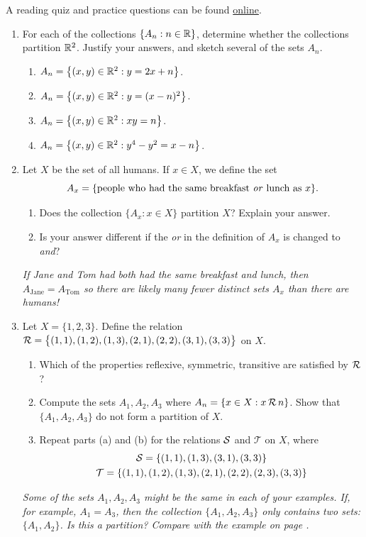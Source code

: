\begin{exercises}{}{}
	A reading quiz and practice questions can be found \href{http://www.math.uci.edu/~ndonalds/math13/selftest/7-4-partitions.html}{online}.

\begin{enumerate}
	\item For each of the collections $\{A_n:n\in\mathbb{R}\}$, determine whether the collections partition $\mathbb{R}^2$. Justify your answers, and sketch several of the sets $A_n$.
	\begin{enumerate}
		\item $A_n=\big\{(x,y)\in\mathbb{R}^2:y=2x+n\big\}$.
	  \item $A_n=\big\{(x,y)\in\mathbb{R}^2:y=(x-n)^2\big\}$.
	  \item $A_n=\big\{(x,y)\in\mathbb{R}^2:xy=n\big\}$.
	  \item $A_n=\big\{(x,y)\in\mathbb{R}^2:y^4-y^2=x-n\big\}$.
	\end{enumerate}\pagebreak[2]
	
	\item Let $X$ be the set of all humans. If $x\in X$, we define the set
	\[A_x=\{\text{people who had the same breakfast \emph{or} lunch as $x$}\}.\]
	\begin{enumerate}
	  \item Does the collection $\{A_x:x\in X\}$ partition $X$? Explain your answer.
	  \item Is your answer different if the \emph{or} in the definition of $A_x$ is changed to \emph{and}?
	\end{enumerate}
	\emph{If Jane and Tom had both had the same breakfast and lunch, then $A_{\text{Jane}}=A_{\text{Tom}}$ so there are likely many fewer \emph{distinct} sets $A_x$ than there are humans!}
	
	\item Let $X=\{1,2,3\}$. Define the relation $\mathcal{R}=\big\{(1,1),(1,2),(1,3),(2,1),(2,2),(3,1),(3,3)\big\}$ on $X$.
	\begin{enumerate}
	  \item Which of the properties reflexive, symmetric, transitive are satisfied by $\mathcal{R}$?
	  \item Compute the sets $A_1,A_2,A_3$ where $A_n=\{x\in X:x\,\mathcal{R}\,n\}$. Show that $\{A_1,A_2,A_3\}$ do not form a partition of $X$.
	  \item Repeat parts (a) and (b) for the relations $\mathcal{S}$ and $\mathcal T$ on $X$, where
	  \begin{gather*}
	  \mathcal{S}=\{(1,1),(1,3),(3,1),(3,3)\}\\
	  \mathcal T=\{(1,1),(1,2),(1,3),(2,1),(2,2),(2,3),(3,3)\}
	  \end{gather*}
	\end{enumerate}
	\emph{Some of the sets $A_1,A_2,A_3$ might be the same in each of your examples. If, for example, $A_1=A_3$, then the collection $\{A_1,A_2,A_3\}$ only contains two sets: $\{A_1,A_2\}$. Is this a partition? Compare with the example on page \pageref{ex:partnot}.}
  

\end{enumerate}
\end{exercises}
